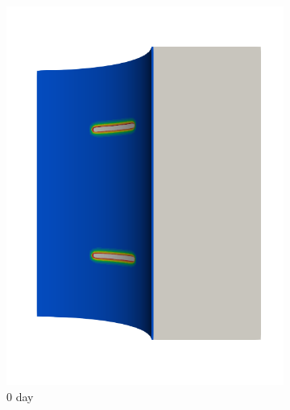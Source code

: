 \begin{figure}[!htb]
  \centering
  \begin{subfigure}[b]{0.2\textwidth}
    \centering
    \includegraphics[width=\textwidth]{Chapter5/figures/spallation/seed_d_1}
    \caption{0 day}
  \end{subfigure}
  \begin{subfigure}[b]{0.2\textwidth}
    \centering

\end{subfigure}
\end{figure}
